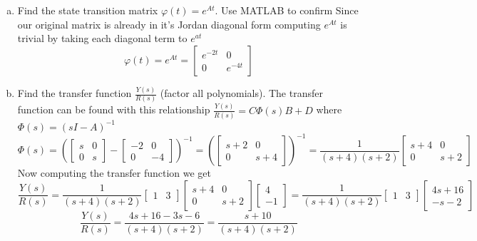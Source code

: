 \documentclass{article}
\begin{document}
\begin{enumerate}[a)]
\item Find the state transition matrix $\varphi (t) = e^{At}$.
{\color{blue} Use MATLAB to confirm}
\newline
Since our original matrix is already in it's Jordan diagonal form computing $e^{At}$ is trivial by taking each diagonal term to $e^{at}$
$$\varphi (t) = e^{At} =
\begin{bmatrix}
e^{-2t} & 0 \\
0 & e^{-4t}
\end{bmatrix}
$$
\item Find the transfer function $\frac{Y(s)}{R(s)}$ (factor all polynomials).
\newline
The transfer function can be found with this relationship $\frac{Y(s)}{R(s)} = C\Phi(s)B  + D $ where  $\Phi(s) = (sI - A)^{-1}$
$$\Phi (s) =
(\begin{bmatrix}
s & 0 \\
0 & s
\end{bmatrix}
-
\begin{bmatrix}
-2 & 0 \\
0 & -4
\end{bmatrix}
)^{-1}
=
(
\begin{bmatrix}
s+2 & 0 \\
0 & s+4
\end{bmatrix}
)^{-1}
=
\frac{1}{(s+4)(s+2)}
\begin{bmatrix}
s+4 & 0 \\
0 & s+2
\end{bmatrix}
$$
Now computing the transfer function we get
$$
\frac{Y(s)}{R(s)}
=
\frac{1}{(s+4)(s+2)}
\begin{bmatrix}
1 & 3
\end{bmatrix}
\begin{bmatrix}
s+4 & 0 \\
0 & s+2
\end{bmatrix}
\begin{bmatrix}
4 \\
-1
\end{bmatrix}
=
\frac{1}{(s+4)(s+2)}
\begin{bmatrix}
1 & 3
\end{bmatrix}
\begin{bmatrix}
4s+16\\
-s-2
\end{bmatrix}
$$
$$
\frac{Y(s)}{R(s)}
=
\frac{4s+16 -3s -6}{(s+4)(s+2)}
=
\frac{s+10}{(s+4)(s+2)}
$$


\end{enumerate}
\end{document}
